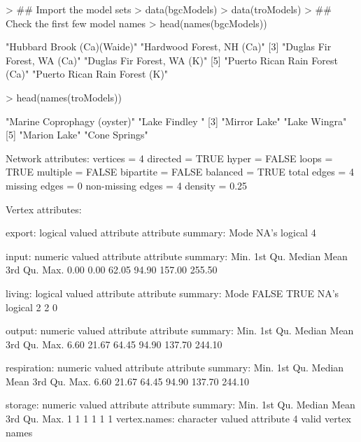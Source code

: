 \documentclass[article]{jss}
\begin{document}
\begin{Schunk}
\begin{Sinput}
> ## Import the model sets
> data(bgcModels)
> data(troModels)
> ## Check the first few model names
> head(names(bgcModels))
\end{Sinput}
\begin{Soutput}
[1] "Hubbard Brook (Ca)(Waide)"     "Hardwood Forest, NH (Ca)"     
[3] "Duglas Fir Forest, WA (Ca)"    "Duglas Fir Forest, WA (K)"    
[5] "Puerto Rican Rain Forest (Ca)" "Puerto Rican Rain Forest (K)" 
\end{Soutput}
\begin{Sinput}
> head(names(troModels))
\end{Sinput}
\begin{Soutput}
[1] "Marine Coprophagy (oyster)" "Lake Findley "             
[3] "Mirror Lake"                "Lake Wingra"               
[5] "Marion Lake"                "Cone Springs"              
\end{Soutput}
\begin{Soutput}
Network attributes:
  vertices = 4
  directed = TRUE
  hyper = FALSE
  loops = TRUE
  multiple = FALSE
  bipartite = FALSE
  balanced = TRUE
 total edges = 4 
   missing edges = 0 
   non-missing edges = 4 
 density = 0.25 

Vertex attributes:

 export:
   logical valued attribute
   attribute summary:
   Mode    NA's 
logical       4 

 input:
   numeric valued attribute
   attribute summary:
   Min. 1st Qu.  Median    Mean 3rd Qu.    Max. 
   0.00    0.00   62.05   94.90  157.00  255.50 

 living:
   logical valued attribute
   attribute summary:
   Mode   FALSE    TRUE    NA's 
logical       2       2       0 

 output:
   numeric valued attribute
   attribute summary:
   Min. 1st Qu.  Median    Mean 3rd Qu.    Max. 
   6.60   21.67   64.45   94.90  137.70  244.10 

 respiration:
   numeric valued attribute
   attribute summary:
   Min. 1st Qu.  Median    Mean 3rd Qu.    Max. 
   6.60   21.67   64.45   94.90  137.70  244.10 

 storage:
   numeric valued attribute
   attribute summary:
   Min. 1st Qu.  Median    Mean 3rd Qu.    Max. 
      1       1       1       1       1       1 
  vertex.names:
   character valued attribute
   4 valid vertex names


\end{Soutput}
\end{Schunk}
\end{document}

